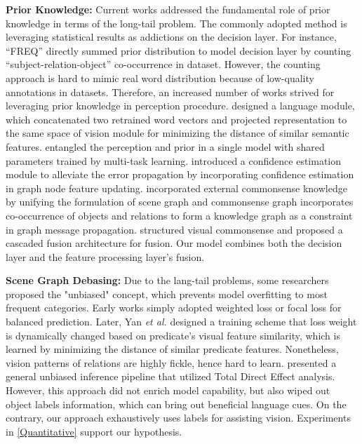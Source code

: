 \documentclass[runningheads]{llncs}
\begin{document}
\noindent\textbf{Prior Knowledge:} Current works addressed the fundamental role
of prior knowledge in terms of the long-tail problem.
The commonly adopted method is leveraging statistical results\cite{motif} as
addictions on the decision layer. For instance, ``FREQ''\cite{motif} directly
summed prior distribution to model decision layer by counting
``subject-relation-object'' co-occurrence in dataset. However, the counting
approach is hard to mimic real word distribution because of low-quality
annotations in datasets. Therefore, an increased number of works strived for
leveraging prior knowledge in perception procedure. \cite{lp} designed a
language module, which concatenated two retrained word vectors and projected
representation to the same space of vision module for minimizing the distance
of similar semantic features. \cite{schemata} entangled the perception and
prior in a single model with shared parameters trained by multi-task learning.
\cite{vctree} introduced a confidence estimation module to alleviate the error
propagation by incorporating confidence estimation in graph node feature
updating. \cite{bridge} incorporated external commonsense knowledge by unifying
the formulation of scene graph and commonsense graph
\cite{kern} incorporates co-occurrence of objects and relations to form a
knowledge graph as a constraint in graph message propagation.
\cite{commonsense} structured visual commonsense and proposed a cascaded fusion
architecture for fusion. Our model combines both the decision layer and the
feature processing layer's fusion.

\noindent\textbf{Scene Graph Debasing:} Due to the lang-tail problems, some
researchers proposed the "unbiased" concept, which prevents model overfitting
to most frequent categories. Early works simply adopted weighted loss or focal
loss\cite{focal} for balanced prediction. Later, Yan \textit{et al.}\cite{pcpl}
designed a training scheme that loss weight is dynamically changed based on
predicate's visual feature similarity, which is learned by minimizing the
distance of similar predicate features. Nonetheless, vision patterns of
relations are highly fickle, hence hard to learn.  \cite{unbias} presented a
general unbiased inference pipeline that utilized Total Direct Effect analysis.
However, this approach did not enrich model capability, but also wiped out
object labels information, which can bring out beneficial language cues.  On
the contrary, our approach exhaustively uses labels for assisting vision.
Experiments in \ref{Quantitative} support our hypothesis.
\end{document}

